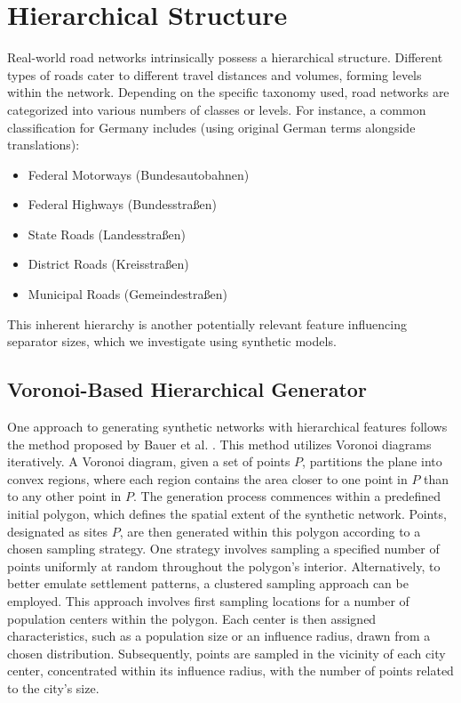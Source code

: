\section{Hierarchical Structure}

Real-world road networks intrinsically possess a hierarchical structure.
Different types of roads cater to different travel distances and volumes, forming levels within the network.
Depending on the specific taxonomy used, road networks are categorized into various numbers of classes or levels.
For instance, a common classification for Germany includes (using original German terms alongside translations):

\begin{itemize}
    \item Federal Motorways (Bundesautobahnen)
    \item Federal Highways (Bundesstraßen)
    \item State Roads (Landesstraßen)
    \item District Roads (Kreisstraßen)
    \item Municipal Roads (Gemeindestraßen)
\end{itemize}

This inherent hierarchy is another potentially relevant feature influencing separator sizes, which we investigate using synthetic models.

\subsection{Voronoi-Based Hierarchical Generator}

One approach to generating synthetic networks with hierarchical features follows the method proposed by Bauer et al. \cite{hutchison_synthetic_2010}.
This method utilizes Voronoi diagrams iteratively.
A Voronoi diagram, given a set of points \(P\), partitions the plane into convex regions, where each region contains the area closer to one point in \(P\) than to any other point in \(P\).
The generation process commences within a predefined initial polygon, which defines the spatial extent of the synthetic network.
Points, designated as sites \(P\), are then generated within this polygon according to a chosen sampling strategy.
One strategy involves sampling a specified number of points uniformly at random throughout the polygon's interior.
Alternatively, to better emulate settlement patterns, a clustered sampling approach can be employed.
This approach involves first sampling locations for a number of population centers within the polygon.
Each center is then assigned characteristics, such as a population size or an influence radius, drawn from a chosen distribution.
Subsequently, points are sampled in the vicinity of each city center, concentrated within its influence radius, with the number of points related to the city's size.

